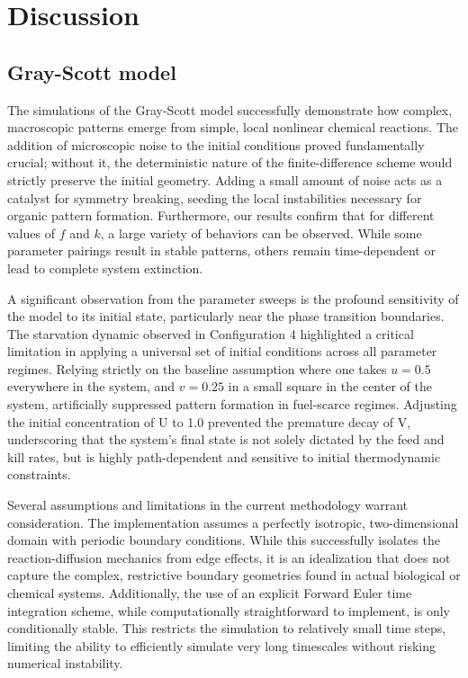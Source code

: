 \documentclass[10pt, journal]{IEEEtran}
\begin{document}
\section{Discussion}

\subsection{Gray-Scott model}

The simulations of the Gray-Scott model successfully demonstrate how complex, macroscopic patterns emerge from simple, local nonlinear chemical reactions. The addition of microscopic noise to the initial conditions proved fundamentally crucial; without it, the deterministic nature of the finite-difference scheme would strictly preserve the initial geometry. Adding a small amount of noise acts as a catalyst for symmetry breaking, seeding the local instabilities necessary for organic pattern formation. Furthermore, our results confirm that for different values of $f$ and $k$, a large variety of behaviors can be observed. While some parameter pairings result in stable patterns, others remain time-dependent or lead to complete system extinction.

A significant observation from the parameter sweeps is the profound sensitivity of the model to its initial state, particularly near the phase transition boundaries. The starvation dynamic observed in Configuration 4 highlighted a critical limitation in applying a universal set of initial conditions across all parameter regimes. Relying strictly on the baseline assumption where one takes $u=0.5$ everywhere in the system, and $v=0.25$ in a small square in the center of the system, artificially suppressed pattern formation in fuel-scarce regimes. Adjusting the initial concentration of U to 1.0 prevented the premature decay of V, underscoring that the system's final state is not solely dictated by the feed and kill rates, but is highly path-dependent and sensitive to initial thermodynamic constraints.

Several assumptions and limitations in the current methodology warrant consideration. The implementation assumes a perfectly isotropic, two-dimensional domain with periodic boundary conditions. While this successfully isolates the reaction-diffusion mechanics from edge effects, it is an idealization that does not capture the complex, restrictive boundary geometries found in actual biological or chemical systems. Additionally, the use of an explicit Forward Euler time integration scheme, while computationally straightforward to implement, is only conditionally stable. This restricts the simulation to relatively small time steps, limiting the ability to efficiently simulate very long timescales without risking numerical instability.
\end{document}
